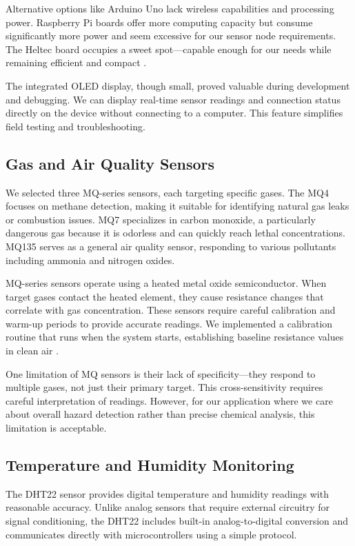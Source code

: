 Alternative options like Arduino Uno lack wireless capabilities and processing power. Raspberry Pi boards offer more computing capacity but consume significantly more power and seem excessive for our sensor node requirements. The Heltec board occupies a sweet spot—capable enough for our needs while remaining efficient and compact \cite{kooijman2015lora}.

The integrated OLED display, though small, proved valuable during development and debugging. We can display real-time sensor readings and connection status directly on the device without connecting to a computer. This feature simplifies field testing and troubleshooting.

\subsection{Gas and Air Quality Sensors}

We selected three MQ-series sensors, each targeting specific gases. The MQ4 focuses on methane detection, making it suitable for identifying natural gas leaks or combustion issues. MQ7 specializes in carbon monoxide, a particularly dangerous gas because it is odorless and can quickly reach lethal concentrations. MQ135 serves as a general air quality sensor, responding to various pollutants including ammonia and nitrogen oxides.

MQ-series sensors operate using a heated metal oxide semiconductor. When target gases contact the heated element, they cause resistance changes that correlate with gas concentration. These sensors require careful calibration and warm-up periods to provide accurate readings. We implemented a calibration routine that runs when the system starts, establishing baseline resistance values in clean air \cite{szczurek2017gas}.

One limitation of MQ sensors is their lack of specificity—they respond to multiple gases, not just their primary target. This cross-sensitivity requires careful interpretation of readings. However, for our application where we care about overall hazard detection rather than precise chemical analysis, this limitation is acceptable.

\subsection{Temperature and Humidity Monitoring}

The DHT22 sensor provides digital temperature and humidity readings with reasonable accuracy. Unlike analog sensors that require external circuitry for signal conditioning, the DHT22 includes built-in analog-to-digital conversion and communicates directly with microcontrollers using a simple protocol.

